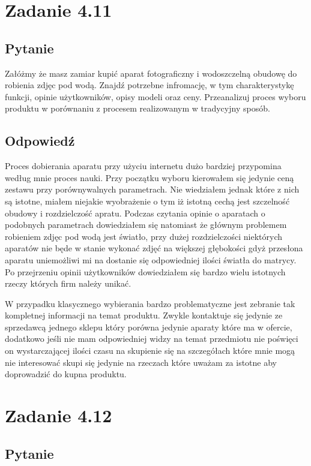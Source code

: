 \documentclass[paper=a4, fontsize=11pt]{scrartcl} %
\numberwithin{equation}{section} %
\numberwithin{figure}{section} %
\numberwithin{table}{section} %
\begin{document}
\section{Zadanie 4.11}

\subsection {Pytanie}

Załóżmy że masz zamiar kupić aparat fotograficzny i wodoszczelną obudowę do robienia zdjęc pod wodą.
Znajdź potrzebne infromację, w tym charakterystykę funkcji, opinie użytkowników, opisy modeli oraz ceny.
Przeanalizuj proces wyboru produktu w porównaniu z procesem realizowanym w tradycyjny sposób.

\subsection {Odpowiedź}

Proces dobierania aparatu przy użyciu internetu dużo bardziej przypomina według mnie proces nauki.
Przy początku wyboru kierowałem się jedynie ceną zestawu przy porównywalnych parametrach. Nie wiedziałem jednak
które z nich są istotne, miałem niejakie wyobrażenie o tym iż istotną cechą jest szczelność obudowy i rozdzielczość
apratu. Podczas czytania opinie o aparatach o podobnych parametrach dowiedziałem się natomiast że głównym problemem
robieniem zdjęc pod wodą jest światło, przy dużej rozdzielczości niektórych aparatów nie będe w stanie wykonać zdjęć
na większej głębokości gdyż przesłona aparatu uniemożliwi mi na dostanie się odpowiedniej ilości światła do matrycy.
Po przejrzeniu opinii użytkowników dowiedziałem się bardzo wielu istotnych rzeczy których firm należy unikać.

W przypadku klasycznego wybierania bardzo problematyczne jest zebranie tak kompletnej informacji na temat produktu.
Zwykle kontaktuje się jedynie ze sprzedawcą jednego sklepu który porówna jedynie aparaty które ma w ofercie, dodatkowo
jeśli nie mam odpowiedniej widzy na temat przedmiotu nie poświęci on wystarczającej ilości czasu na skupienie się na
szczegółach które mnie mogą nie interesować skupi się jedynie na rzeczach które uważam za istotne aby doprowadzić do
kupna produktu.

\section{Zadanie 4.12}

\subsection {Pytanie}
\end{document}
